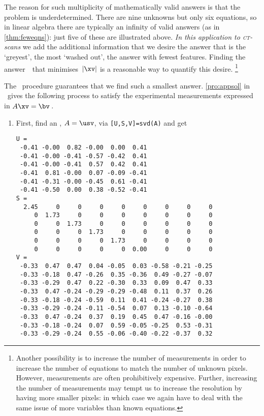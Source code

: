 \begin{example}
The reason for such multiplicity of mathematically valid answers is that the problem is underdetermined.  
There are nine unknowns but only six equations, so in linear algebra there are typically an infinity of valid answers (as in \autoref{thm:feweqns}): just five of these are illustrated above.
\emph{In this application to \textsc{ct}-scans} we add the additional information that we desire the answer that is the `greyest', the most `washed out', the answer with fewest features.
Finding the answer~\xv\ that minimises~\(|\xv|\) is a reasonable way to quantify this desire.
\footnote{Another possibility is to increase the number of measurements in order to increase the number of equations to match the number of unknown pixels.
However, measurements are often prohibitively expensive.
Further, increasing the number of measurements may tempt us to increase the resolution by having more smaller pixels: in which case we again have to deal with the same issue of more variables than known equations.}

The \svd\ procedure guarantees that we find such a smallest answer.
\autoref{pro:appsol} in \script\ gives the following process to satisfy the experimental measurements expressed in \(A\xv=\bv\)\,.
\begin{enumerate}
\item First, find an \svd, \(A=\usv\), via \verb|[U,S,V]=svd(A)| and get \twodp
\setbox\ajrqrbox\hbox{}%
\marginpar{\usebox{\ajrqrbox\\[2ex]}}%
\begin{small}
\begin{verbatim}
U =
 -0.41 -0.00  0.82 -0.00  0.00  0.41
 -0.41 -0.00 -0.41 -0.57 -0.42  0.41
 -0.41 -0.00 -0.41  0.57  0.42  0.41
 -0.41  0.81 -0.00  0.07 -0.09 -0.41
 -0.41 -0.31 -0.00 -0.45  0.61 -0.41
 -0.41 -0.50  0.00  0.38 -0.52 -0.41
S =
  2.45     0     0     0     0     0     0     0     0
     0  1.73     0     0     0     0     0     0     0
     0     0  1.73     0     0     0     0     0     0
     0     0     0  1.73     0     0     0     0     0
     0     0     0     0  1.73     0     0     0     0
     0     0     0     0     0  0.00     0     0     0
V =
 -0.33  0.47  0.47  0.04 -0.05  0.03 -0.58 -0.21 -0.25
 -0.33 -0.18  0.47 -0.26  0.35 -0.36  0.49 -0.27 -0.07
 -0.33 -0.29  0.47  0.22 -0.30  0.33  0.09  0.47  0.33
 -0.33  0.47 -0.24 -0.29 -0.29 -0.48  0.11  0.37  0.26
 -0.33 -0.18 -0.24 -0.59  0.11  0.41 -0.24 -0.27  0.38
 -0.33 -0.29 -0.24 -0.11 -0.54  0.07  0.13 -0.10 -0.64
 -0.33  0.47 -0.24  0.37  0.19  0.45  0.47 -0.16 -0.00
 -0.33 -0.18 -0.24  0.07  0.59 -0.05 -0.25  0.53 -0.31
 -0.33 -0.29 -0.24  0.55 -0.06 -0.40 -0.22 -0.37  0.32
\end{verbatim}
\end{small}



\end{enumerate}
\end{example}
